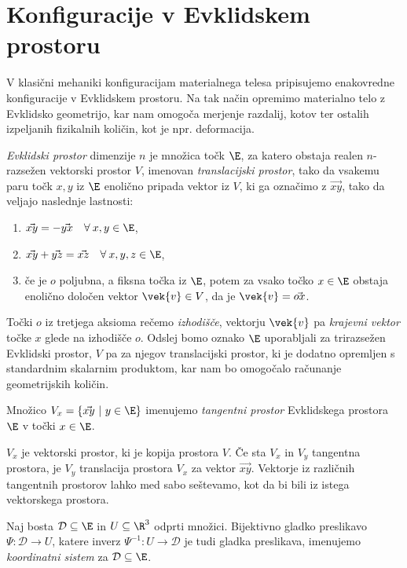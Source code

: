 \section{Konfiguracije v Evklidskem prostoru}\label{sec-ep}

V klasični mehaniki konfiguracijam materialnega telesa pripisujemo enakovredne
konfiguracije v Evklidskem prostoru. Na tak način opremimo materialno telo
z Evklidsko geometrijo, kar nam omogoča merjenje razdalij, kotov ter
ostalih izpeljanih fizikalnih količin, kot je npr. deformacija.

\begin{definicija}
	\emph{Evklidski prostor} dimenzije $n$ je množica točk $\E$, za katero obstaja
	realen $n$-razsežen vektorski prostor $V$, imenovan \emph{translacijski prostor},
	tako da vsakemu paru točk $x,y$ iz $\E$ enolično pripada vektor iz $V$, ki ga označimo
	z $\vec{xy}$, tako da veljajo naslednje lastnosti:
	\begin{enumerate}
		\item $\vec{xy}=-\vec{yx} \quad \forall\: x,y\in\E$,
		\item $\vec{xy}+\vec{yz}=\vec{xz} \quad \forall\: x,y,z\in\E$,
		\item če je $o$ poljubna, a fiksna točka iz $\E$, potem za vsako točko $x\in\E$ obstaja
		enolično določen vektor $\vek{v}\in V$, da je $\vek{v}=\vec{ox}$.
	\end{enumerate}
\end{definicija}
Točki $o$ iz tretjega aksioma rečemo \emph{izhodišče}, vektorju $\vek{v}$ pa \emph{krajevni
vektor} točke $x$ glede na izhodišče $o$. Odslej bomo oznako $\E$ uporabljali za trirazsežen
Evklidski prostor, $V$ pa za njegov translacijski prostor, ki je dodatno opremljen
s standardnim skalarnim produktom, kar nam bo omogočalo računanje geometrijskih količin.
\begin{definicija}
	Množico $V_x=\{\vec{xy}\ |\ y\in\E\}$ imenujemo \emph{tangentni prostor} Evklidskega prostora
	$\E$ v točki $x\in\E$.
\end{definicija}
$V_x$ je vektorski prostor, ki je kopija prostora $V$. Če sta $V_x$ in $V_y$ tangentna prostora,
je $V_y$ translacija prostora $V_x$ za vektor $\vec{xy}$. Vektorje iz različnih tangentnih prostorov
lahko med sabo seštevamo, kot da bi bili iz istega vektorskega prostora.

\begin{definicija}\label{def-ks}
	Naj bosta $\mathcal{D}\subseteq \E$ in $U\subseteq\R^3$ odprti množici. Bijektivno gladko preslikavo
	$\Psi\colon\mathcal{D}\rightarrow U$, katere inverz $\Psi^{-1}\colon U\rightarrow\mathcal{D}$
	je tudi gladka preslikava, imenujemo \emph{koordinatni sistem} za $\mathcal{D}\subseteq \E$.
\end{definicija}

